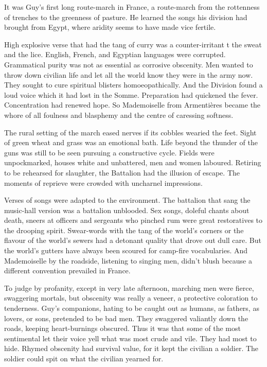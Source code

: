 It was Guy's first long route-march in France, a route-march from the rottenness of trenches to the greenness of pasture. He learned the songs his division had brought from Egypt, where aridity seems to have made vice fertile.

High explosive verse that had the tang of curry was a counter-irritant t the sweat and the lice. English, French, and Egyptian languages were corrupted. Grammatical purity was not as essential as corrosive obscenity. Men wanted to throw down civilian life and let all the world know they were in the army now. They sought to cure spiritual blisters homoeopathically. And the Division found a loud voice which it had lost in the Somme. Preparation had quickened the fever. Concentration had renewed hope. So Mademoiselle from Armenti\`{e}res became the whore of all foulness and blasphemy and the centre of caressing softness.

The rural setting of the march eased nerves if its cobbles wearied the feet. Sight of green wheat and grass was an emotional bath. Life beyond the thunder of the guns was still to be seen pursuing a constructive cycle. Fields were unpockmarked, houses white and unbattered, men and women laboured. Retiring to be rehearsed for slaughter, the Battalion had the illusion of escape. The moments of reprieve were crowded with uncharnel impressions.

Verses of songs were adapted to the environment. The battalion that sang the music-hall version was a battalion unblooded. Sex songs, doleful chants about death, sneers at officers and sergeants who pinched rum were great restoratives to the drooping spirit. Swear-words with the tang of the world's corners or the flavour of the world's sewers had a detonant quality that drove out dull care. But the world's gutters have always been scoured for camp-fire vocabularies. And Mademoiselle by the roadside, listening to singing men, didn't blush because a different convention prevailed in France.

To judge by profanity, except in very late afternoon, marching men were fierce, swaggering mortals, but obscenity was really a veneer, a protective coloration to tenderness. Guy's companions, hating to be caught out as humans, as fathers, as lovers, or sons, pretended to be bad men. They swaggered valiantly down the roads, keeping heart-burnings obscured. Thus it was that some of the most sentimental let their voice yell what was most crude and vile. They had most to hide. Rhymed obscenity had survival value, for it kept the civilian a soldier. The soldier could spit on what the civilian yearned for.

